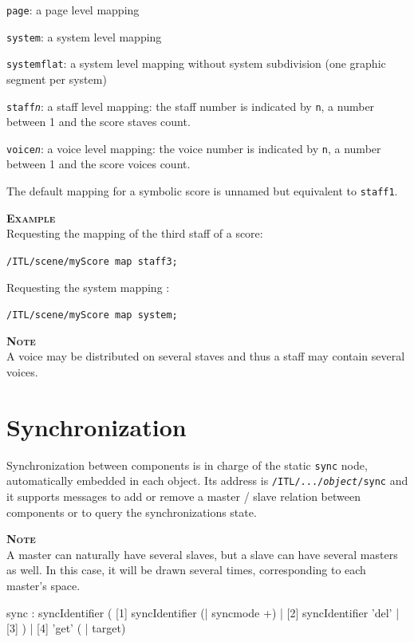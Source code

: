 \documentclass[a4paper,twoside]{report}
\newcommand{\toplevel}[1]	{\chapter{#1}}
\newcommand{\OSC}[1]		{\texttt{#1}}
\newcommand{\example}		{\textbf{\hspace{-1.5cm}\textbf{\textsc{Example }}}}
\newcommand{\note}	[1]		{\vspace{2mm}\textbf{\hspace{-1.03cm}\textbf{\textsc{Note #1}}}}
\let\olditemize\itemize
\let\oldenditemize\enditemize
\renewenvironment{itemize} 	{\olditemize \setlength{\itemsep}{1mm}}{\oldenditemize}
\newcommand{\sample}	[1]			{\vspace{-2mm}\begin{center}\colorbox{mygrey}{
								\begin{minipage}[t]{0.9\columnwidth} 
								{\small \texttt{#1}}
								\end{minipage}}\end{center}}
\begin{document}
\begin{itemize}
\item \OSC{page}: a page level mapping
\item \OSC{system}: a system level mapping
\item \OSC{systemflat}: a system level mapping without system subdivision (one graphic segment per system)
\item \OSC{staff\textit{n}}: a staff level mapping: the staff number is indicated by \OSC{n}, a number between 1 and the score staves count.
\item \OSC{voice\textit{n}}: a voice level mapping: the voice number is indicated by \OSC{n}, a number between 1 and the score voices count.
\end{itemize}

The default mapping for a symbolic score is unnamed but equivalent to \OSC{staff1}.

\example \\
Requesting the mapping of the third staff of a score:
\sample{/ITL/scene/myScore map staff3;}
Requesting the system mapping :
\sample{/ITL/scene/myScore map system;}

\note{} \\
A voice may be distributed on several staves and thus a staff may contain several voices.


\toplevel{Synchronization}
\label{syncmsg}

Synchronization between components is in charge of the static \OSC{sync} node, automatically embedded in each object. Its address is \OSC{/ITL/.../\textit{object}/sync} and it supports messages to add or remove a master / slave relation between components or to query the synchronizations state.

\note{} \\
A master can naturally have several slaves, but a slave can have several masters as well. In this case, it will be drawn several times, corresponding to each master's space.

\begin{rail}
sync : syncIdentifier 
	 ( [1] syncIdentifier (| syncmode +) 
	   | [2] syncIdentifier 'del'
	   | [3] )
	   | [4] 'get' ( | target)
\end{rail}
\end{document}
